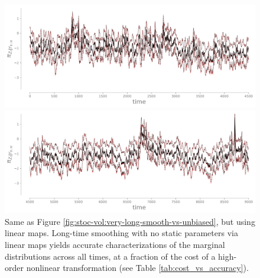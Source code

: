 \documentclass[twoside,11pt]{article}
\begin{document}
\clearpage
\begin{figure}
  \begin{center}
    \includegraphics[width=.9\textwidth, bb=25bp 25bp 800bp 290bp, clip]{o1-smoothing-marginals-vs-unbiased-timesteps-chunk-0_long_wide.pdf}

    \vspace{10pt}

    \includegraphics[width=.9\textwidth, bb=25bp 0bp 800bp 290bp, clip]{o1-smoothing-marginals-vs-unbiased-timesteps-chunk-1_long_wide.pdf}
    \caption{
      Same as Figure \ref{fig:stoc-vol:very-long-smooth-vs-unbiased}, but 
      using linear maps.
      Long-time smoothing with no static parameters via linear maps
      yields accurate characterizations of the marginal distributions
      across all times, at a fraction of the cost of a high-order
      nonlinear transformation (see Table \ref{tab:cost_vs_accuracy}).
    }
    \label{fig:stoc-vol:very-long-smooth-vs-unbiased-linear} 
  \end{center}
\end{figure}
\clearpage


\vskip 0.2in
%
%
%

\end{document}
